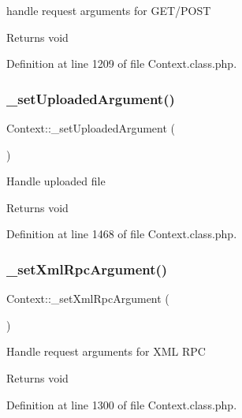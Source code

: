 handle request arguments for G\+E\+T/\+P\+O\+ST

\begin{DoxyReturn}{Returns}
void 
\end{DoxyReturn}


Definition at line 1209 of file Context.\+class.\+php.

\mbox{\label{classContext_a9c821f96670ef47c7139bafc6b39091b}} 
\subsubsection{\texorpdfstring{\+\_\+set\+Uploaded\+Argument()}{\_setUploadedArgument()}}
{\footnotesize\ttfamily Context\+::\+\_\+set\+Uploaded\+Argument (\begin{DoxyParamCaption}{ }\end{DoxyParamCaption})}

Handle uploaded file

\begin{DoxyReturn}{Returns}
void 
\end{DoxyReturn}


Definition at line 1468 of file Context.\+class.\+php.

\mbox{\label{classContext_abaa9eeef192a9e4b48a06d0af9b1fd05}} 
\subsubsection{\texorpdfstring{\+\_\+set\+Xml\+Rpc\+Argument()}{\_setXmlRpcArgument()}}
{\footnotesize\ttfamily Context\+::\+\_\+set\+Xml\+Rpc\+Argument (\begin{DoxyParamCaption}{ }\end{DoxyParamCaption})}

Handle request arguments for X\+ML R\+PC

\begin{DoxyReturn}{Returns}
void 
\end{DoxyReturn}


Definition at line 1300 of file Context.\+class.\+php.

